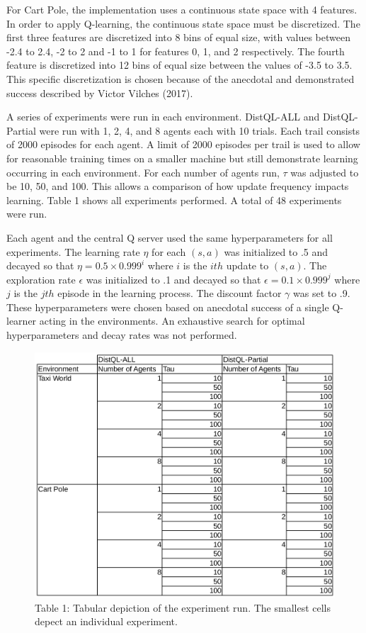 \documentclass[jair,twoside,11pt,theapa]{article}
\begin{document}
For Cart Pole, the implementation uses a continuous state space with 4 features. In order to apply Q-learning, the continuous state space must be discretized. The first three features are discretized into 8 bins of equal size, with values between -2.4 to 2.4, -2 to 2 and -1 to 1 for features 0, 1, and 2 respectively. The fourth feature is discretized into 12 bins of equal size between the values of -3.5 to 3.5. This specific discretization is chosen because of the anecdotal and demonstrated success described by Victor Vilches (2017)\nocite{Victor:github}. 

A series of experiments were run in each environment. DistQL-ALL and DistQL-Partial were run with 1, 2, 4, and 8 agents each with 10 trials. Each trail consists of 2000 episodes for each agent. A limit of 2000 episodes per trail is used to allow for reasonable training times on a smaller machine but still demonstrate learning occurring in each environment. For each number of agents run, $\tau$ was adjusted to be 10, 50, and 100. This allows a comparison of how update frequency impacts learning. Table 1 shows all experiments performed. A total of 48 experiments were run. 

Each agent and the central Q server used the same hyperparameters for all experiments. The learning rate $\eta$ for each $(s,a)$ was initialized to .5 and decayed so that $\eta = 0.5 \times 0.999^i$ where $i$ is the $ith$ update to $(s,a)$. The exploration rate $\epsilon$ was initialized to .1 and decayed so that $\epsilon = 0.1 \times 0.999^j$ where $j$ is the $jth$ episode in the learning process. The discount factor $\gamma$ was set to .9. These hyperparameters were chosen based on anecdotal success of a single Q-learner acting in the environments. An exhaustive search for optimal hyperparameters and decay rates was not performed. 

\begin{figure}[h]
\centering
\includegraphics[width=0.7\linewidth]{ExperimentTable}
\caption*{Table 1: Tabular depiction of the experiment run. The smallest cells depect an individual experiment. }
\label{fig:ExperimentTable}
\end{figure}
\end{document}
